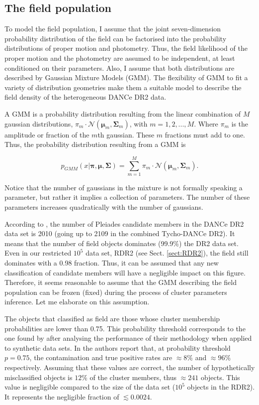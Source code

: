 \subsection{The field population}
To model the field population, I assume that the joint seven-dimension probability distribution of the field can be factorised into the probability distributions of proper motion and photometry. Thus, the field likelihood of the proper motion and the photometry are assumed to be independent, at least conditioned on their parameters. Also, I assume that both distributions are described by Gaussian Mixture Models (GMM). The flexibility of GMM to fit a variety of distribution geometries make them a suitable model to describe the field density of the heterogeneous DANCe DR2 data. 

A GMM is a probability distribution resulting from the linear combination of $M$ gaussian distributions, $\pi_m\cdot \mathcal{N}(\boldsymbol{\mu}_m,\boldsymbol{\Sigma}_m)$, with $m=1,2,...,M$. Where $\pi_m$ is the amplitude or fraction of the $m$th gaussian. These $m$ fractions must add to one. Thus, the probability distribution resulting from a GMM is

\begin{equation}
p_{GMM}(x|\boldsymbol{\pi},\boldsymbol{\mu},\boldsymbol{\Sigma})=\sum_{m=1}^M \pi_m \cdot \mathcal{N}(\boldsymbol{\mu}_m,\boldsymbol{\Sigma}_m).
\end{equation}

Notice that the number of gaussians in the mixture is not formally speaking a parameter, but rather it implies a collection of parameters. The number of these parameters increases quadratically with the number of gaussians. 

According to \citet{Bouy2015}, the number of Pleiades candidate members in the DANCe DR2 data set is 2010 (going up to 2109 in the combined Tycho-DANCe DR2). It means that the number of field objects dominates (99.9\%) the DR2 data set. Even in our restricted $10^5$ data set, RDR2 (see Sect. \ref{sect:RDR2}), the field still dominates with a 0.98 fraction. Thus, it can be assumed that any new classification of candidate members will have a negligible impact on this figure. Therefore, it seems reasonable to assume that the GMM describing the field population can be frozen (fixed) during the process of cluster parameters inference. Let me elaborate on this assumption.

The objects that \citet{Bouy2015} classified as field are those whose cluster membership probabilities are lower than 0.75. This probability threshold corresponds to the one found by \citet{Sarro2014} after analysing the performance of their methodology when applied to synthetic data sets. In \citet{Sarro2014} the authors report that, at probability threshold $p=0.75$, the contamination and true positive rates are $\approx 8\%$ and $ \approx96\%$ respectively. Assuming that these values are correct, the number of hypothetically misclassified objects is $12\%$ of the cluster members, thus $\approx 241 $ objects. This value is negligible compared to the size of the data set ($10^5$ objects in the RDR2). It represents the negligible fraction of $ \lesssim0.0024$. 

